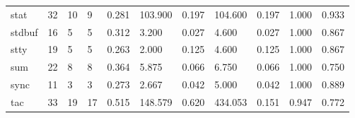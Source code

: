 \begin{longtable}{lp{1.2cm}p{1.2cm}p{1.2cm}p{1.2cm}p{1.2cm}p{1.2cm}p{1.2cm}p{1.2cm}p{1.2cm}p{1.2cm}}
stat      &                           32 &                 10 &                                 9 &                                      0.281 &                                103.900 &                                        0.197 &                           104.600 &                                   0.197 &                              1.000 &                                              0.933 \\
stdbuf    &                           16 &                  5 &                                 5 &                                      0.312 &                                  3.200 &                                        0.027 &                             4.600 &                                   0.027 &                              1.000 &                                              0.867 \\
stty      &                           19 &                  5 &                                 5 &                                      0.263 &                                  2.000 &                                        0.125 &                             4.600 &                                   0.125 &                              1.000 &                                              0.867 \\
sum       &                           22 &                  8 &                                 8 &                                      0.364 &                                  5.875 &                                        0.066 &                             6.750 &                                   0.066 &                              1.000 &                                              0.750 \\
sync      &                           11 &                  3 &                                 3 &                                      0.273 &                                  2.667 &                                        0.042 &                             5.000 &                                   0.042 &                              1.000 &                                              0.889 \\
tac       &                           33 &                 19 &                                17 &                                      0.515 &                                148.579 &                                        0.620 &                           434.053 &                                   0.151 &                              0.947 &                                              0.772 \\

\end{longtable}
